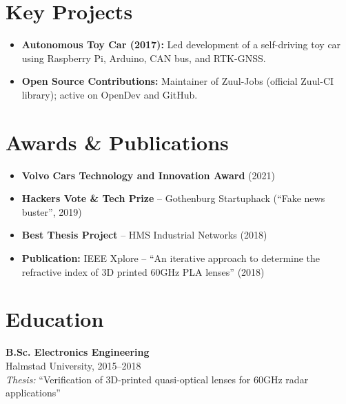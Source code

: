 \documentclass[11pt,a4paper]{article}
\begin{document}
\section{Key Projects}
\begin{itemize}[leftmargin=*]
    \item \textbf{Autonomous Toy Car (2017):} Led development of a self-driving toy car using Raspberry Pi, Arduino, CAN bus, and RTK-GNSS.
    \item \textbf{Open Source Contributions:} Maintainer of Zuul-Jobs (official Zuul-CI library); active on OpenDev and GitHub.
\end{itemize}

\section{Awards \& Publications}
\begin{itemize}[leftmargin=*]
    \item \textbf{Volvo Cars Technology and Innovation Award} (2021)
    \item \textbf{Hackers Vote \& Tech Prize} -- Gothenburg Startuphack (``Fake news buster'', 2019)
    \item \textbf{Best Thesis Project} -- HMS Industrial Networks (2018)
    \item \textbf{Publication:} IEEE Xplore -- ``An iterative approach to determine the refractive index of 3D printed 60GHz PLA lenses'' (2018)
\end{itemize}

\section{Education}
\textbf{B.Sc. Electronics Engineering} \\
Halmstad University, 2015--2018 \\
\textit{Thesis:} ``Verification of 3D-printed quasi-optical lenses for 60GHz radar applications''
\end{document}
